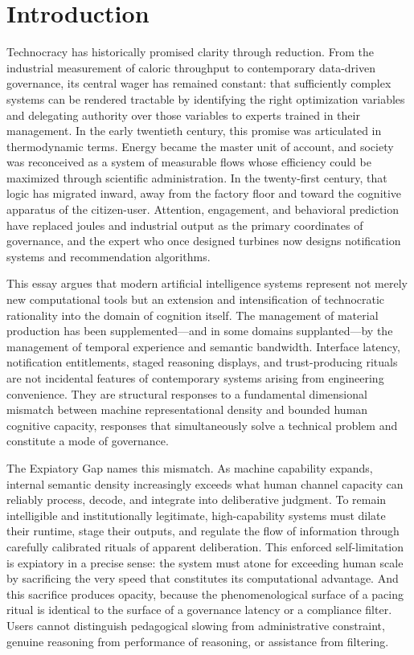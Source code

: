\documentclass[12pt]{article}
\begin{document}
\newpage
\tableofcontents
\newpage

\section{Introduction}

Technocracy has historically promised clarity through reduction. From the industrial measurement of caloric throughput to contemporary data-driven governance, its central wager has remained constant: that sufficiently complex systems can be rendered tractable by identifying the right optimization variables and delegating authority over those variables to experts trained in their management. In the early twentieth century, this promise was articulated in thermodynamic terms. Energy became the master unit of account, and society was reconceived as a system of measurable flows whose efficiency could be maximized through scientific administration. In the twenty-first century, that logic has migrated inward, away from the factory floor and toward the cognitive apparatus of the citizen-user. Attention, engagement, and behavioral prediction have replaced joules and industrial output as the primary coordinates of governance, and the expert who once designed turbines now designs notification systems and recommendation algorithms.

This essay argues that modern artificial intelligence systems represent not merely new computational tools but an extension and intensification of technocratic rationality into the domain of cognition itself. The management of material production has been supplemented---and in some domains supplanted---by the management of temporal experience and semantic bandwidth. Interface latency, notification entitlements, staged reasoning displays, and trust-producing rituals are not incidental features of contemporary systems arising from engineering convenience. They are structural responses to a fundamental dimensional mismatch between machine representational density and bounded human cognitive capacity, responses that simultaneously solve a technical problem and constitute a mode of governance.

The Expiatory Gap names this mismatch. As machine capability expands, internal semantic density increasingly exceeds what human channel capacity can reliably process, decode, and integrate into deliberative judgment. To remain intelligible and institutionally legitimate, high-capability systems must dilate their runtime, stage their outputs, and regulate the flow of information through carefully calibrated rituals of apparent deliberation. This enforced self-limitation is expiatory in a precise sense: the system must atone for exceeding human scale by sacrificing the very speed that constitutes its computational advantage. And this sacrifice produces opacity, because the phenomenological surface of a pacing ritual is identical to the surface of a governance latency or a compliance filter. Users cannot distinguish pedagogical slowing from administrative constraint, genuine reasoning from performance of reasoning, or assistance from filtering.
\end{document}
